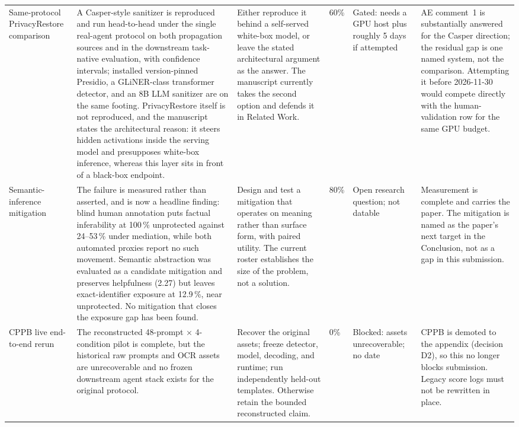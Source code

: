 \documentclass[11pt]{article}
\begin{document}
\begin{longtable}{p{}p{}p{}p{}p{}p{}}
Same-protocol PrivacyRestore comparison & A Casper-style sanitizer is reproduced and run head-to-head under the single real-agent protocol on both propagation sources and in the downstream task-native evaluation, with confidence intervals; installed version-pinned Presidio, a GLiNER-class transformer detector, and an 8B LLM sanitizer are on the same footing. PrivacyRestore itself is not reproduced, and the manuscript states the architectural reason: it steers hidden activations inside the serving model and presupposes white-box inference, whereas this layer sits in front of a black-box endpoint. & Either reproduce it behind a self-served white-box model, or leave the stated architectural argument as the answer. The manuscript currently takes the second option and defends it in Related Work. & 60\% & Gated: needs a GPU host plus roughly 5 days if attempted & AE comment~1 is substantially answered for the Casper direction; the residual gap is one named system, not the comparison. Attempting it before 2026-11-30 would compete directly with the human-validation row for the same GPU budget. \\
Semantic-inference mitigation & The failure is measured rather than asserted, and is now a headline finding: blind human annotation puts factual inferability at 100\,\% unprotected against 24--53\,\% under mediation, while both automated proxies report no such movement. Semantic abstraction was evaluated as a candidate mitigation and preserves helpfulness (2.27) but leaves exact-identifier exposure at 12.9\,\%, near unprotected. No mitigation that closes the exposure gap has been found. & Design and test a mitigation that operates on meaning rather than surface form, with paired utility. The current roster establishes the size of the problem, not a solution. & 80\% & Open research question; not datable & Measurement is complete and carries the paper. The mitigation is named as the paper's next target in the Conclusion, not as a gap in this submission. \\
CPPB live end-to-end rerun & The reconstructed 48-prompt $\times$ 4-condition pilot is complete, but the historical raw prompts and OCR assets are unrecoverable and no frozen downstream agent stack exists for the original protocol. & Recover the original assets; freeze detector, model, decoding, and runtime; run independently held-out templates. Otherwise retain the bounded reconstructed claim. & 0\% & Blocked: assets unrecoverable; no date & CPPB is demoted to the appendix (decision D2), so this no longer blocks submission. Legacy score logs must not be rewritten in place. \\

\end{longtable}
\end{document}
